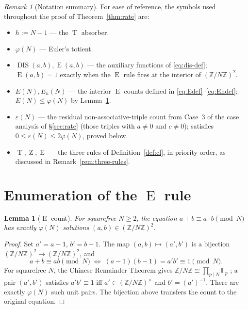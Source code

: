 \documentclass[11pt,reqno]{amsart}
\theoremstyle{plain}
\newtheorem{lemma}[theorem]{Lemma}
\theoremstyle{definition}
\theoremstyle{remark}
\newtheorem*{remark}{Remark}
\DeclareMathOperator{\DIS}{DIS}
\DeclareMathOperator{\ECHO}{E}
\DeclareMathOperator{\HARM}{T}
\DeclareMathOperator{\VOID}{Z}
\newcommand{\ZN}{\mathbb{Z}/N\mathbb{Z}}
\begin{document}
\begin{remark}[Notation summary]\label{rem:notation}
For ease of reference, the symbols used throughout the proof of
Theorem~\ref{thm:rate} are:
\begin{itemize}\setlength\itemsep{0pt}
\item $h := N-1$ \;---\; the $\HARM$ absorber.
\item $\varphi(N)$ \;---\; Euler's totient.
\item $\DIS(a,b), \ECHO(a,b)$ \;---\; the auxiliary functions of
  \eqref{eq:dis-def}; $\ECHO(a,b)=1$ exactly when the $\ECHO$ rule
  fires at the interior of $(\ZN)^{2}$.
\item $E(N), E_{h}(N)$ \;---\; the interior $\ECHO$ counts
  defined in \eqref{eq:Edef}--\eqref{eq:Ehdef}; $E(N)\le\varphi(N)$
  by Lemma~\ref{lem:echo}.
\item $\varepsilon(N)$ \;---\; the residual non-associative-triple
  count from Case~3 of the case analysis of \S\ref{sec:rate}
  (those triples with $a\neq 0$ and $c\neq 0$); satisfies
  $0\le\varepsilon(N)\le 2\varphi(N)$, proved below.
\item $\HARM, \VOID, \ECHO$ \;---\; the three rules of
  Definition~\ref{def:cl}, in priority order, as discussed in
  Remark~\ref{rem:three-rules}.
\end{itemize}
\end{remark}

\section{Enumeration of the $\ECHO$ rule}\label{sec:enum}

\begin{lemma}[$\ECHO$ count]\label{lem:echo}
For squarefree $N\ge 2$, the equation $a+b\equiv a\cdot b\pmod N$ has
\emph{exactly} $\varphi(N)$ solutions $(a,b)\in(\ZN)^{2}$.
\end{lemma}

\begin{proof}
Set $a'=a-1$, $b'=b-1$. The map $(a,b)\mapsto(a',b')$ is a bijection
$(\ZN)^{2}\to(\ZN)^{2}$, and
\[
  a+b\equiv ab\pmod N
  \;\Longleftrightarrow\;
  (a-1)(b-1)=a'b'\equiv 1\pmod N.
\]
For squarefree $N$, the Chinese Remainder Theorem gives
$\ZN\cong\prod_{p\mid N}\mathbb F_{p}$ \cite{Gauss1801,Lang2002};
a pair $(a',b')$ satisfies $a'b'\equiv 1$ iff $a'\in(\ZN)^{\times}$
and $b'=(a')^{-1}$. There are exactly $\varphi(N)$ such unit pairs.
The bijection above transfers the count to the original equation.
\end{proof}
\end{document}
